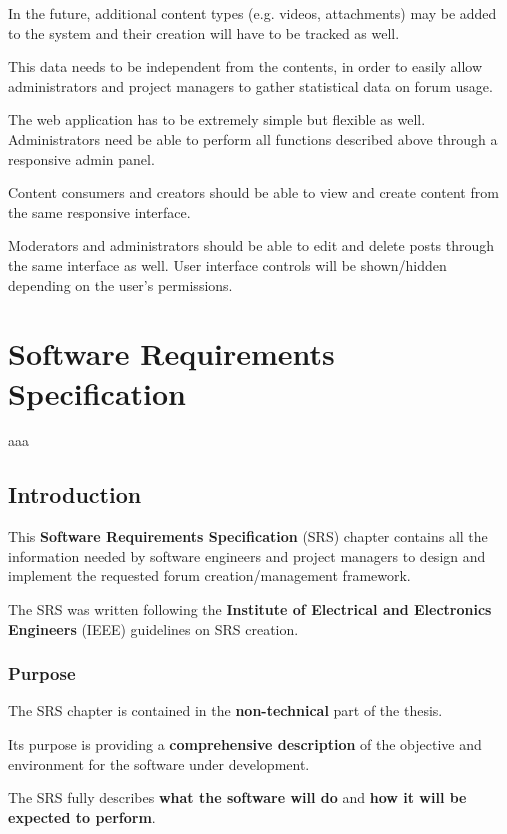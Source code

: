 \documentclass[12pt]{report}
\renewcommand\emph{\textbf}
\begin{document}
            In the future, additional content types (e.g. videos, attachments) may be added to the system and their creation will have to be tracked as well.

            This data needs to be independent from the contents, in order to easily allow administrators and project managers to gather statistical data on forum usage.

            The web application has to be extremely simple but flexible as well. Administrators need be able to perform all functions described above through a responsive admin panel.

            Content consumers and creators should be able to view and create content from the same responsive interface.

            Moderators and administrators should be able to edit and delete posts through the same interface as well. User interface controls will be shown/hidden depending on the user’s permissions.

        \chapter{Software Requirements Specification}
            aaa

            \section{Introduction}
                This \emph{Software Requirements Specification} (SRS) chapter contains all the information needed by software engineers and project managers to design and implement the requested forum creation/management framework.

                The SRS was written following the \emph{Institute of Electrical and Electronics Engineers} (IEEE) guidelines on SRS creation.



                \subsection{Purpose}
                    The SRS chapter is contained in the \emph{non-technical} part of the thesis.

                    Its purpose is providing a \emph{comprehensive description} of the objective and environment for the software under development.

                    The SRS fully describes \emph{what the software will do} and \emph{how it will be expected to perform}.
\end{document}

